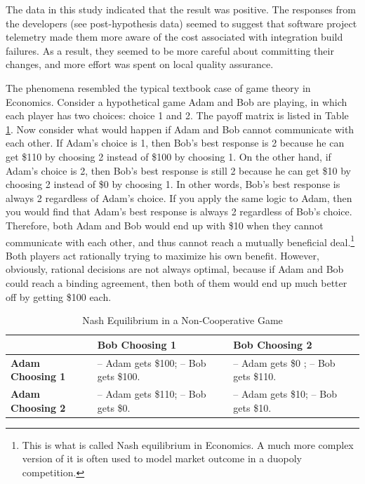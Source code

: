 The data in this study indicated that the result was positive. The responses from the developers (see post-hypothesis data) seemed to suggest that software project telemetry made them more aware of the cost associated with integration build failures. As a result, they seemed to be more careful about committing their changes, and more effort was spent on local quality assurance.

The phenomena resembled the typical textbook case of game theory in Economics. Consider a hypothetical game Adam and Bob are playing, in which each player has two choices: choice 1 and 2. The payoff matrix is listed in Table \ref{table:NashEquilibrium}. Now consider what would happen if Adam and Bob cannot communicate with each other. If Adam's choice is 1, then Bob's best response is 2 because he can get \$110 by choosing 2 instead of \$100 by choosing 1. On the other hand, if Adam's choice is 2, then Bob's best response is still 2 because he can get \$10 by choosing 2 instead of \$0 by choosing 1. In other words, Bob's best response is always 2 regardless of Adam's choice. If you apply the same logic to Adam, then you would find that Adam's best response is always 2 regardless of Bob's choice. Therefore, both Adam and Bob would end up with \$10 when they cannot communicate with each other, and thus cannot reach a mutually beneficial deal.\footnote{This is what is called Nash equilibrium in Economics. A much more complex version of it is often used to model market outcome in a duopoly competition.} Both players act rationally trying to maximize his own benefit. However, obviously, rational decisions are not always optimal, because if Adam and Bob could reach a binding agreement, then both of them would end up much better off by getting \$100 each. 

\begin{table}[tbp]
	\centering
		\caption{Nash Equilibrium in a Non-Cooperative Game}
		\begin{tabular}{|p{}|p{}|p{}|} 
			\hline
			{} & \textbf{Bob Choosing 1} & \textbf{Bob Choosing 2} \\
			\hline
			\textbf{Adam Choosing 1} & -- Adam gets \$100; -- Bob gets \$100. & -- Adam gets \$0 ; -- Bob gets \$110. 
			\\
			\hline
			\textbf{Adam Choosing 2} & -- Adam gets \$110; -- Bob gets \$0. & -- Adam gets \$10; -- Bob gets \$10. 
			\\
			\hline
		\end{tabular}
	\label{table:NashEquilibrium}
\end{table}


